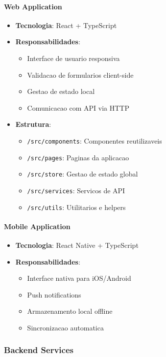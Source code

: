 \paragraph{Web Application}
\begin{itemize}
    \item \textbf{Tecnologia}: React + TypeScript
    \item \textbf{Responsabilidades}:
    \begin{itemize}
        \item Interface de usuario responsiva
        \item Validacao de formularios client-side
        \item Gestao de estado local
        \item Comunicacao com API via HTTP
    \end{itemize}
    \item \textbf{Estrutura}:
    \begin{itemize}
        \item \texttt{/src/components}: Componentes reutilizaveis
        \item \texttt{/src/pages}: Paginas da aplicacao
        \item \texttt{/src/store}: Gestao de estado global
        \item \texttt{/src/services}: Servicos de API
        \item \texttt{/src/utils}: Utilitarios e helpers
    \end{itemize}
\end{itemize}

\paragraph{Mobile Application}
\begin{itemize}
    \item \textbf{Tecnologia}: React Native + TypeScript
    \item \textbf{Responsabilidades}:
    \begin{itemize}
        \item Interface nativa para iOS/Android
        \item Push notifications
        \item Armazenamento local offline
        \item Sincronizacao automatica
    \end{itemize}
\end{itemize}

\subsubsection{Backend Services}

